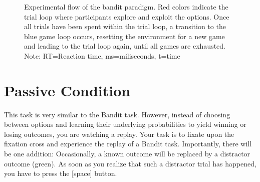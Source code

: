 \documentclass[12pt, oneside]{scrartcl}
\newcommand{\descrTextWidth}{4cm}
\begin{document}
\begin{figure}[h!]
\begin{center}
{
} %
\captionsetup{width=1\linewidth, format=plain}
\caption[Flow Bandit Paradigm]{Experimental flow of the bandit paradigm. Red colors indicate the trial loop where participants explore and exploit the options. Once all trials have been spent within the trial loop, a transition to the blue game loop occurs, resetting the environment for a new game and leading to the trial loop again, until all games are exhausted. Note: RT=Reaction time, ms=miliseconds, t=time}
\label{fig:banditFlow}
\end{center}
\end{figure}




\pagebreak
\section{Passive Condition}

This task is very similar to the Bandit task. However, instead of choosing between options and learning their underlying probabilities to yield winning or losing outcomes, you are watching a replay. Your task is to fixate upon the fixation cross and experience the replay of a Bandit task. Importantly, there will be one addition: Occasionally, a known outcome will be replaced by a distractor outcome (green). As soon as you realize that such a distractor trial has happened, you have to press the [space] button. \vspace{\baselineskip}
\end{document}
